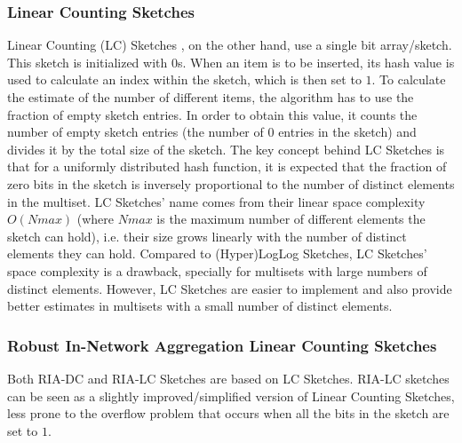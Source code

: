 \subsubsection{Linear Counting Sketches}
\label{sec:line-count-sketch}
Linear Counting (LC) Sketches \cite{Whang:1990uh}, on the other hand,
use a single bit array/sketch. This sketch is initialized with $0$s.
When an item is to be inserted, its hash value is used to calculate an
index within the sketch, which is then set to $1$. To calculate the
estimate of the number of different items, the algorithm has to use
the fraction of empty sketch entries. In order to obtain this value,
it counts the number of empty sketch entries (the number of $0$
entries in the sketch) and divides it by the total size of the sketch.
The key concept behind LC Sketches is that for a uniformly distributed
hash function, it is expected that the fraction of zero bits in the
sketch is inversely proportional to the number of distinct elements in
the multiset. LC Sketches' name comes from their linear space
complexity $O(Nmax)$ (where $Nmax$ is the maximum number of different
elements the sketch can hold), i.e. their size grows linearly with the
number of distinct elements they can hold. Compared to (Hyper)LogLog
Sketches, LC Sketches' space complexity is a drawback, specially for
multisets with large numbers of distinct elements. However, LC
Sketches are easier to implement and also provide better estimates in
multisets with a small number of distinct elements. 

\subsubsection{Robust In-Network Aggregation Linear Counting Sketches}
\label{sec:robust-netw-linear}
Both RIA-DC \cite{Fan:2008wl,YaoChungFanArbeeLPChen:2010to} and RIA-LC
Sketches \cite{YaoChungFanArbeeLPChen:2010to} are based on LC
Sketches. RIA-LC sketches can be seen as a slightly
improved/simplified version of Linear Counting Sketches, less prone to
the overflow problem that occurs when all the bits in the sketch are
set to $1$. 

